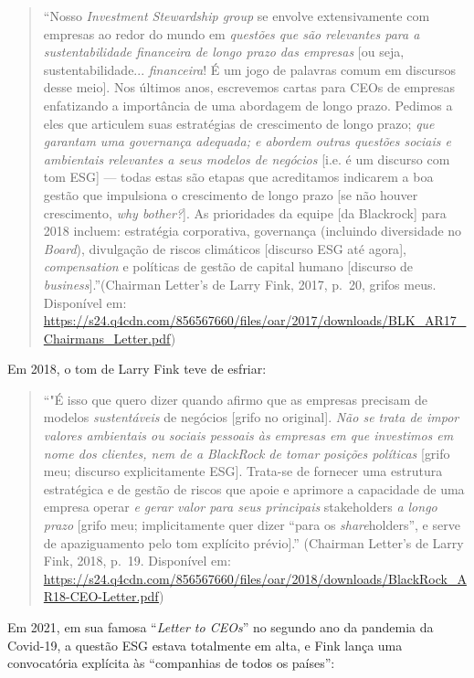 \documentclass[12pt]{article}
\begin{document}
\begin{quote}
    ``Nosso \textit{Investment Stewardship group} se envolve extensivamente com empresas ao redor do mundo em \textit{questões que são relevantes para a sustentabilidade financeira de longo prazo das empresas} [ou seja, sustentabilidade... \textit{financeira}! É um jogo de palavras comum em discursos desse meio]. Nos últimos anos, escrevemos cartas para CEOs de empresas enfatizando a importância de uma abordagem de longo prazo. Pedimos a eles que articulem suas estratégias de crescimento de longo prazo; \textit{que garantam uma governança adequada; e abordem outras questões sociais e ambientais relevantes a seus modelos de negócios} {[}i.e. é um discurso com tom ESG{]} --- todas estas são etapas que acreditamos indicarem a boa gestão que impulsiona o crescimento de longo prazo {[}se não houver crescimento, \textit{why bother?}{]}. As prioridades da equipe [da Blackrock] para 2018 incluem: estratégia corporativa, governança (incluindo diversidade no \textit{Board}), divulgação de riscos climáticos {[}discurso ESG até agora{]}, \textit{compensation} e políticas de gestão de capital humano {[}discurso de \textit{business}{]}.''(Chairman Letter's de Larry Fink, 2017, p.~20, grifos meus. Disponível em: \url{https://s24.q4cdn.com/856567660/files/oar/2017/downloads/BLK_AR17_Chairmans_Letter.pdf})
\end{quote}

Em 2018, o tom de Larry Fink teve de esfriar: 

\begin{quote}
    ``"É isso que quero dizer quando afirmo que as empresas precisam de modelos \textit{sustentáveis} de negócios {[}grifo no original{]}. \textit{Não se trata de impor valores ambientais ou sociais pessoais às empresas em que investimos em nome dos clientes, nem de a BlackRock de tomar posições políticas} {[}grifo meu; discurso explicitamente ESG{]}. Trata-se de fornecer uma estrutura estratégica e de gestão de riscos que apoie e aprimore a capacidade de uma empresa operar \textit{e gerar valor para seus principais} stakeholders \textit{a longo prazo} [grifo meu; implicitamente quer dizer ``para os \textit{share}holders'', e serve de apaziguamento pelo tom explícito prévio].'' (Chairman Letter's de Larry Fink, 2018, p.~19. Disponível em: \url{https://s24.q4cdn.com/856567660/files/oar/2018/downloads/BlackRock_AR18-CEO-Letter.pdf})
\end{quote}

Em 2021, em sua famosa ``\textit{Letter to CEOs}'' no segundo ano da
pandemia da Covid-19, a questão ESG estava totalmente em alta, e Fink
lança uma convocatória explícita às ``companhias de todos os países'':
\end{document}
